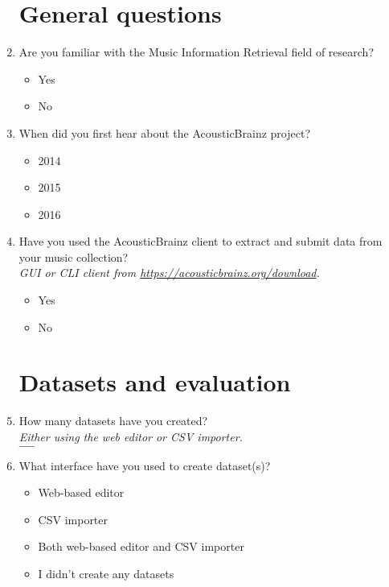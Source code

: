 \begin{enumerate}
    
    \section*{General questions}

    \item Are you familiar with the Music Information Retrieval field of research?
    \begin{itemize}[label=$\circ$]
        \item Yes
        \item No
    \end{itemize}

    \item When did you first hear about the AcousticBrainz project?
    \begin{itemize}[label=$\circ$]
        \item 2014
        \item 2015
        \item 2016
    \end{itemize}
    
    \item Have you used the AcousticBrainz client to extract and submit data from your music collection? \\
    \textit{GUI or CLI client from \url{https://acousticbrainz.org/download}.}
    \begin{itemize}[label=$\circ$]
        \item Yes
        \item No
    \end{itemize}

    \section*{Datasets and evaluation}

    \item How many datasets have you created? \\
    \textit{Either using the web editor or CSV importer.} \\
    $\_\_\_\_$

    \item What interface have you used to create dataset(s)?
    \begin{itemize}[label=$\square$]
        \item Web-based editor
        \item CSV importer
        \item Both web-based editor and CSV importer
        \item I didn't create any datasets
    \end{itemize}


\end{enumerate}
